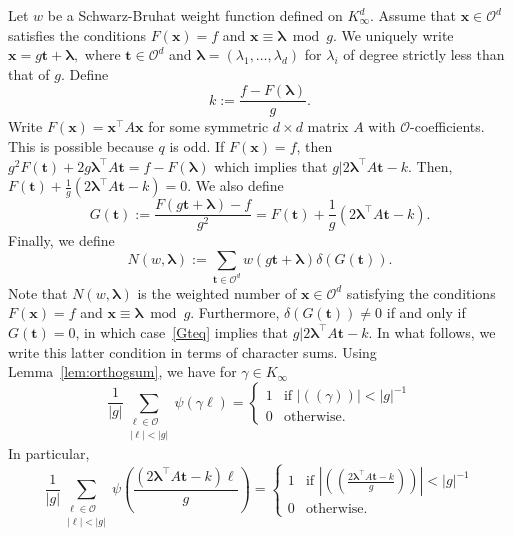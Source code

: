 \documentclass[10pt]{amsart}
\theoremstyle{plain}
\theoremstyle{plain}
\renewcommand{\vec}[1]{\mathbf{#1}}
\theoremstyle{remark}
\theoremstyle{definition}
\newcommand{\Ki}{K_\infty}
\newcommand{\cO}{\mathcal{O}}
\begin{document}
Let $w$ be a Schwarz-Bruhat weight function defined on $\Ki^d$. Assume that $\vec{x}\in \mathcal{O}^d$ satisfies the conditions $F(\vec{x})=f$ and $\vec{x}\equiv \boldsymbol{\lambda}\bmod g$. We uniquely write $\vec{x}=g\vec{t}+ \boldsymbol{\lambda},$ where $\vec{t}\in  \mathcal{O}^d$ and $\boldsymbol{\lambda}=(\lambda_1,\dots,\lambda_d)$ for $\lambda_i$ of degree strictly less than that of $g$. Define 
\begin{equation}\label{defk}
k:= \frac{f-F(\boldsymbol{\lambda})}{g}.
\end{equation}
Write $F(\vec{x})=\vec{x}^{\intercal}A\vec{x}$ for some symmetric $d\times d$ matrix $A$ with $\mathcal{O}$-coefficients. This is possible because $q$ is odd. If
$F(\vec{x}) =f$, then $g^2F(\vec{t})+2g\boldsymbol{\lambda}^{\intercal} A\vec{t} =f-F(\boldsymbol{\lambda})$ which implies that $g|2\boldsymbol{\lambda}^{\intercal}A\vec{t}-k.$ 
 Then, 
$F(\vec{t})+\frac{1}{g}(2\boldsymbol{\lambda}^{\intercal} A\vec{t}-k )=0.$
We also define 
\begin{equation}\label{Gteq}G(\vec{t}):=\frac{F(g\vec{t}+\boldsymbol{\lambda})-f}{g^2}=F(\vec{t})+\frac{1}{g}(2\boldsymbol{\lambda}^{\intercal} A\vec{t}-k).\end{equation}
Finally, we  define 
\begin{equation}\label{Nsum}N(w,\boldsymbol{\lambda}):=\sum_{\vec{t}\in\mathcal{O}^d} w(g\vec{t}+\boldsymbol{\lambda}) \delta{(G(\vec{t}))}.
\end{equation}  Note that $N(w,\boldsymbol{\lambda})$ is the weighted number of $\boldsymbol{x}\in\mathcal{O}^d$ satisfying the conditions  $F(\vec{x})=f$ and $\vec{x}\equiv \boldsymbol{\lambda}\bmod g$. Furthermore, $\delta(G(\vec{t}))\neq 0$ if and only if $G(\vec{t})=0$, in which case~\eqref{Gteq} implies that $g|2\boldsymbol{\lambda}^{\intercal} A\vec{t}-k$. In what follows, we write this latter condition in terms of character sums. Using Lemma~\ref{lem:orthogsum}, we have for $\gamma\in\Ki$
\[
\frac{1}{|g|}\sum_{\substack{\ell\in \cO\\ |\ell|<|g|}}\psi(\gamma \ell)=\begin{cases}1 & \mbox{if $|(\!(\gamma)\!)|<|g|^{-1}$}\\ 0 & \mbox{otherwise.}\end{cases}
\]
In particular,
\begin{equation}\label{inparticular}
\frac{1}{|g|}\sum_{\substack{\ell\in \cO\\ |\ell|<|g|}}\psi\left(\frac{(2\boldsymbol{\lambda}^{\intercal} A\vec{t}-k)\ell}{g}\right)=\begin{cases}1 & \mbox{if $|(\!(\frac{2\boldsymbol{\lambda}^{\intercal} A\vec{t}-k}{g})\!)|<|g|^{-1}$}\\ 0 & \mbox{otherwise.}\end{cases}
\end{equation}
\end{document}
